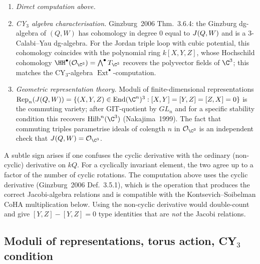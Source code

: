 \begin{verification}
\label{opus:verif:jacobi-is-C3}
\mbox{}
\begin{enumerate}
\item \emph{Direct computation above.}
\item \emph{CY$_3$ algebra characterisation.} Ginzburg~2006 Thm.~3.6.4:
the Ginzburg dg-algebra of $(Q, W)$ has cohomology in degree $0$ equal to $J(Q, W)$
and is a $3$-Calabi--Yau dg-algebra. For the Jordan triple loop with cubic potential,
this cohomology coincides with the polynomial ring $k[X, Y, Z]$, whose Hochschild
cohomology $\HH^\bullet(\mathcal{O}_{\C^3}) = \bigwedge^\bullet T_{\C^3}$ recovers
the polyvector fields of $\C^3$; this matches the CY$_3$-algebra
$\operatorname{Ext}^\bullet$-computation.
\item \emph{Geometric representation theory.} Moduli of finite-dimensional representations
$\operatorname{Rep}_n(\Jac(Q,W)) = \{(X,Y,Z) \in \mathrm{End}(\C^n)^3 : [X,Y]=[Y,Z]=[Z,X]=0\}$
is the commuting variety; after GIT-quotient by $GL_n$ and for a specific stability condition
this recovers $\Hilb^n(\C^3)$ (Nakajima~1999). The fact that commuting triples parametrise
ideals of colength $n$ in $\mathcal{O}_{\C^3}$ is an independent check that $\Jac(Q,W) = \mathcal{O}_{\C^3}$.
\end{enumerate}
\end{verification}

\begin{remark}
\label{opus:rem:sign-jacobi}
A subtle sign arises if one confuses the cyclic derivative with the ordinary
(non-cyclic) derivative on $kQ$. For a cyclically invariant element, the two
agree up to a factor of the number of cyclic rotations. The computation above uses
the cyclic derivative (Ginzburg~2006 Def.~3.5.1), which is the operation that
produces the correct Jacobi-algebra relations and is compatible with the
Kontsevich--Soibelman CoHA multiplication below. Using the non-cyclic derivative
would double-count and give $[Y,Z] - [Y,Z] = 0$ type identities that are
\emph{not} the Jacobi relations.
\end{remark}

\subsection{Moduli of representations, torus action, CY$_3$ condition}
\label{opus:sec:moduli-torus}

